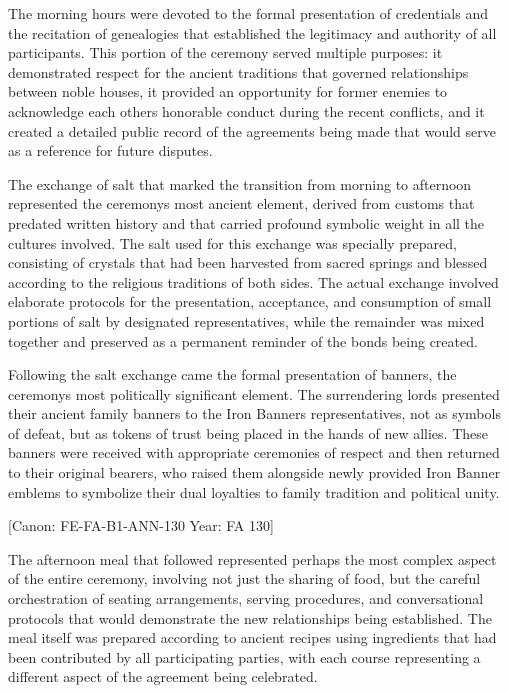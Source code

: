 The morning hours were devoted to the formal presentation of credentials
and the recitation of genealogies that established the legitimacy and
authority of all participants. This portion of the ceremony served
multiple purposes: it demonstrated respect for the ancient traditions
that governed relationships between noble houses, it provided an
opportunity for former enemies to acknowledge each
other\textquotesingle s honorable conduct during the recent conflicts,
and it created a detailed public record of the agreements being made
that would serve as a reference for future disputes.

The exchange of salt that marked the transition from morning to
afternoon represented the ceremony\textquotesingle s most ancient
element, derived from customs that predated written history and that
carried profound symbolic weight in all the cultures involved. The salt
used for this exchange was specially prepared, consisting of crystals
that had been harvested from sacred springs and blessed according to the
religious traditions of both sides. The actual exchange involved
elaborate protocols for the presentation, acceptance, and consumption of
small portions of salt by designated representatives, while the
remainder was mixed together and preserved as a permanent reminder of
the bonds being created.

Following the salt exchange came the formal presentation of banners, the
ceremony\textquotesingle s most politically significant element. The
surrendering lords presented their ancient family banners to the Iron
Banner\textquotesingle s representatives, not as symbols of defeat, but
as tokens of trust being placed in the hands of new allies. These
banners were received with appropriate ceremonies of respect and then
returned to their original bearers, who raised them alongside newly
provided Iron Banner emblems to symbolize their dual loyalties to family
tradition and political unity.

{[}Canon: FE-FA-B1-ANN-130 \textbar{} Year: FA 130{]}

The afternoon meal that followed represented perhaps the most complex
aspect of the entire ceremony, involving not just the sharing of food,
but the careful orchestration of seating arrangements, serving
procedures, and conversational protocols that would demonstrate the new
relationships being established. The meal itself was prepared according
to ancient recipes using ingredients that had been contributed by all
participating parties, with each course representing a different aspect
of the agreement being celebrated.


